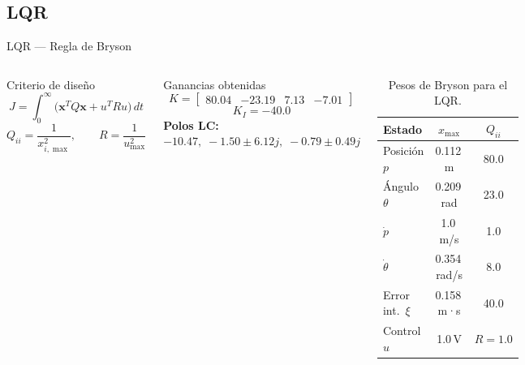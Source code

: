 \documentclass[mathserif,spanish,10pt]{beamer}
\begin{document}
\subsection{LQR}

\begin{frame}{LQR — Regla de Bryson}
\begin{columns}[T]
  \begin{block}{Criterio de diseño}
    \[
      J = \int_0^\infty \!\bigl(\mathbf{x}^TQ\mathbf{x} + u^TRu\bigr)\,dt
    \]
    \[
      Q_{ii} = \frac{1}{x_{i,\max}^2}, \qquad
      R = \frac{1}{u_{\max}^2}
    \]
  \end{block}

  \vspace{4pt}
  \begin{block}{Ganancias obtenidas}
    \centering\scriptsize
    \[
      K = \begin{bmatrix}80.04 & {-}23.19 & 7.13 & {-}7.01\end{bmatrix}
    \]
    \[
      K_I = -40.0
    \]
    \textbf{Polos LC:}\;
    $-10.47,\;{-}1.50\pm 6.12j,\;{-}0.79\pm 0.49j$
  \end{block}

  \begin{table}
    \centering
    \caption{Pesos de Bryson para el LQR.}
    \label{tab:bryson}
    \scriptsize
    \begin{tabular}{p{1.5cm}cc}
      \rowcolor{rowhdr}
      \color{white}\textbf{Estado} &
      \color{white}$x_{\max}$ &
      \color{white}$Q_{ii}$ \\
      \midrule
      Posición $p$         & 0.112\,m     & 80.0 \\
      Ángulo $\theta$      & 0.209\,rad   & 23.0 \\
      $\dot{p}$            & 1.0\,m/s     & 1.0 \\
      $\dot{\theta}$       & 0.354\,rad/s & 8.0 \\
      Error int.\ $\xi$    & 0.158\,m·s   & 40.0 \\
      Control $u$          & 1.0\,V       & $R=1.0$ \\
    \end{tabular}
  \end{table}
\end{columns}
\end{frame}

\end{document}
